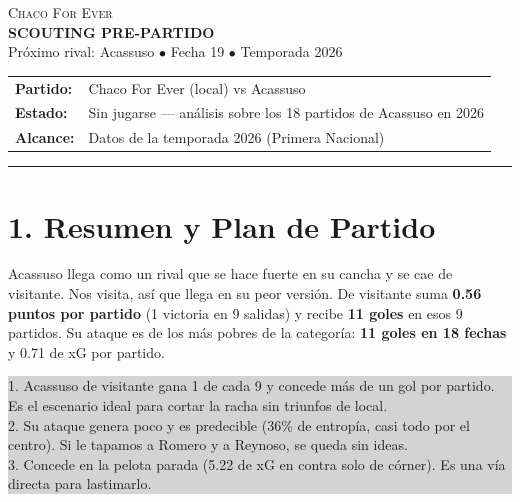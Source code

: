 \documentclass[11pt, a4paper]{article}
\newcommand{\mR}[1]{{\setlength{\fboxsep}{1.5pt}\colorbox{markred}{\textbf{#1}}}}
\newcommand{\alertbox}[2]{%
  \noindent\colorbox{lightgray}{%
    \parbox{\dimexpr\textwidth-2\fboxsep\relax}{%
      \raggedright\smallskip
      \textbf{\color{alertred}{#1}}\par\smallskip
      \small #2\par\smallskip}}%
  \par\vspace{3mm}}
\begin{document}
\begin{center}
  \colorbox{primary}{%
    \parbox{\dimexpr\textwidth-2\fboxsep\relax}{%
      \vspace{4mm}\centering\color{white}
      \textsc{\Large Chaco For Ever} \\ \vspace{1mm}
      \textbf{\Large SCOUTING PRE-PARTIDO} \\ \vspace{1mm}
      \small Próximo rival: Acassuso $\bullet$ Fecha 19 $\bullet$ Temporada 2026
      \vspace{4mm}}}
\end{center}
\vspace{3mm}

\begin{tabular}{ll}
  \textbf{Partido:} & Chaco For Ever (local) vs Acassuso \\
  \textbf{Estado:} & Sin jugarse — análisis sobre los 18 partidos de Acassuso en 2026 \\
  \textbf{Alcance:} & Datos de la temporada 2026 (Primera Nacional) \\
\end{tabular}
\vspace{3mm}
\hrule
\vspace{3mm}

\section*{1. Resumen y Plan de Partido}

Acassuso llega como un rival que se hace fuerte en su cancha y se cae de visitante. Nos visita, así que llega en su peor versión. De visitante suma \mR{0.56 puntos por partido} (1 victoria en 9 salidas) y recibe \mR{11 goles} en esos 9 partidos. Su ataque es de los más pobres de la categoría: \mR{11 goles en 18 fechas} y 0.71 de xG por partido.

\alertbox{Las tres claves del partido}{
  1. Acassuso de visitante gana 1 de cada 9 y concede más de un gol por partido. Es el escenario ideal para cortar la racha sin triunfos de local. \\[1mm]
  2. Su ataque genera poco y es predecible (36\% de entropía, casi todo por el centro). Si le tapamos a Romero y a Reynoso, se queda sin ideas. \\[1mm]
  3. Concede en la pelota parada (5.22 de xG en contra solo de córner). Es una vía directa para lastimarlo.
}
\end{document}
